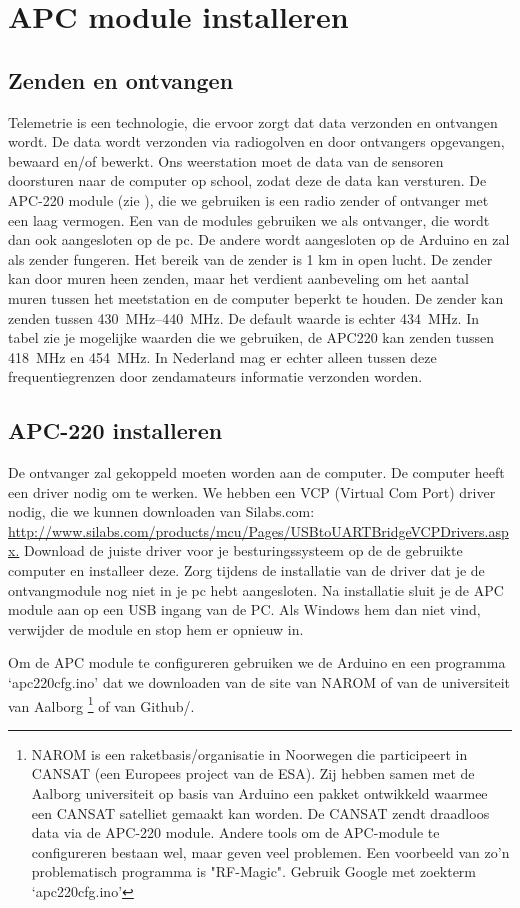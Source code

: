 \section{APC module installeren}

\subsection{Zenden en ontvangen} Telemetrie is een technologie, die
ervoor zorgt dat data verzonden en ontvangen wordt. De data wordt
verzonden via radiogolven en door ontvangers opgevangen, bewaard en/of
bewerkt. Ons weerstation moet de data van de sensoren doorsturen naar de
\hisparc computer op school, zodat deze de data kan versturen. De
APC-220 module (zie ), die we gebruiken is een
radio zender of ontvanger met een laag vermogen. Een van de modules
gebruiken we als ontvanger, die wordt dan ook aangesloten op de pc. De
andere wordt aangesloten op de Arduino en zal als zender fungeren. Het
bereik van de zender is 1 km in open lucht. De zender kan door muren heen
zenden, maar het verdient aanbeveling om het aantal muren tussen het
meetstation en de computer beperkt te houden. De zender kan zenden
tussen \SIrange{430}{440}{\MHz}. De default waarde is echter
\SI{434}{\MHz}. In tabel zie je mogelijke waarden die we gebruiken, de APC220 
kan zenden tussen \SI{418}{\MHz} en \SI{454}{\MHz}.
In Nederland mag er echter alleen tussen deze frequentiegrenzen door
zendamateurs informatie verzonden worden.


\subsection{APC-220 installeren}
De ontvanger zal gekoppeld moeten worden aan de computer. De computer heeft 
een driver nodig om te werken. We hebben een VCP (Virtual Com Port) driver nodig, 
die we kunnen downloaden van Silabs.com:
\url{http://www.silabs.com/products/mcu/Pages/USBtoUARTBridgeVCPDrivers.aspx.}
Download de juiste driver voor je besturingssysteem op de de gebruikte computer
en installeer deze. Zorg tijdens de installatie van de driver dat je de 
ontvangmodule nog niet in je pc hebt aangesloten.
Na installatie sluit je de APC module  aan op een 
USB ingang van de PC. Als Windows hem dan niet vind, verwijder de module en 
stop hem er opnieuw in.

Om de APC module te configureren gebruiken we de Arduino en een
programma `apc220cfg.ino' dat we downloaden van de site van NAROM of van
de universiteit van Aalborg \footnote{NAROM is een
raketbasis/organisatie in Noorwegen die participeert in CANSAT (een
Europees project van de ESA). Zij hebben samen met de Aalborg
universiteit op basis van Arduino een pakket ontwikkeld waarmee een
CANSAT satelliet gemaakt kan worden. De CANSAT zendt draadloos data via
de APC-220 module. Andere tools om de APC-module te configureren bestaan
wel, maar geven veel problemen. Een voorbeeld van zo'n problematisch
programma is "RF-Magic". Gebruik Google met zoekterm `apc220cfg.ino'} of van
Github/\hisparc. 

